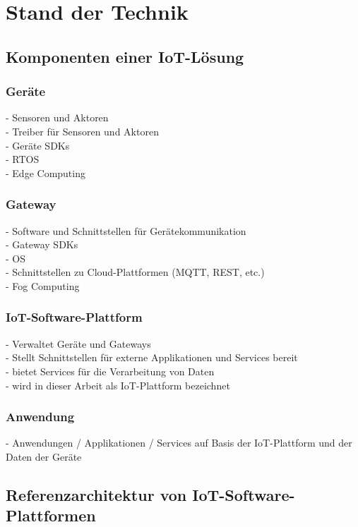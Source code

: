 \chapter{Stand der Technik}\label{ch:Stand der Technik}
\section{Komponenten einer IoT-Lösung}\label{sec:Komponenten einer IoT-Lösung}
\subsection{Geräte}\label{subsec:Geräte}
- Sensoren und Aktoren\\
- Treiber für Sensoren und Aktoren\\
- Geräte SDKs\\
- RTOS\\
- Edge Computing\\
\subsection{Gateway}\label{subsec:Gateway}
- Software und Schnittstellen für Gerätekommunikation\\
- Gateway SDKs\\
- OS\\
- Schnittstellen zu Cloud-Plattformen (MQTT, REST, etc.)\\
- Fog Computing\\
\subsection{IoT-Software-Plattform}\label{subsec:IoT-Software-Plattform}
- Verwaltet Geräte und Gateways\\
- Stellt Schnittstellen für externe Applikationen und Services bereit\\
- bietet Services für die Verarbeitung von Daten\\
- wird in dieser Arbeit als IoT-Plattform bezeichnet\\
\subsection{Anwendung}\label{subsec:Anwendung}
- Anwendungen / Applikationen / Services auf Basis der IoT-Plattform und der Daten der Geräte\\
\section{Referenzarchitektur von IoT-Software-Plattformen}\label{sec:Referenzarchitektur von IoT-Software-Plattformen}

